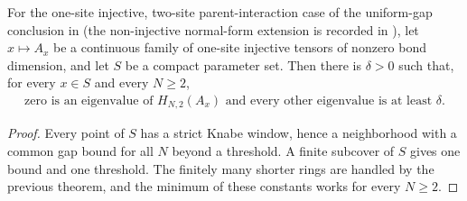 \begin{theorem}
    \label{thm:compact_parent_gap}
    \leanok
    For the one-site injective, two-site parent-interaction case of the
    uniform-gap conclusion in
    \cite[Appendix~A, lines~2575--2580]{Schuch2011Phases} (the non-injective
    normal-form extension is recorded in
    \cite{gap:spc11_uniform_gap_injective_scope}), let $x\mapsto A_x$ be a
    continuous family of one-site injective tensors of nonzero bond dimension,
    and let $S$ be a compact parameter set. Then there is $\delta>0$ such
    that, for every $x\in S$ and every $N\geq2$,
    \begin{align}
        \text{zero is an eigenvalue of }H_{N,2}(A_x)
        \text{ and every other eigenvalue is at least }\delta.
        \label{eq:compact_parent_gap}
    \end{align}
\end{theorem}

\begin{proof}
    \leanok
    Every point of $S$ has a strict Knabe window, hence a neighborhood with a
    common gap bound for all $N$ beyond a threshold. A finite subcover of $S$
    gives one bound and one threshold. The finitely many shorter rings are
    handled by the previous theorem, and the minimum of these constants works
    for every $N\geq2$.
\end{proof}

